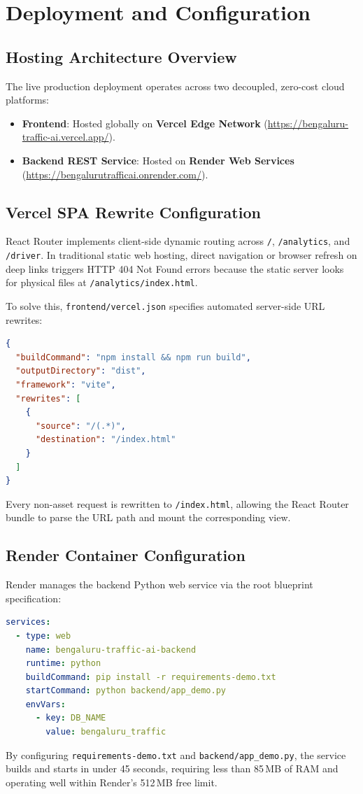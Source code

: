 \chapter{Deployment and Configuration}

\section{Hosting Architecture Overview}
The live production deployment operates across two decoupled, zero-cost cloud platforms:
\begin{itemize}[leftmargin=*]
    \item \textbf{Frontend}: Hosted globally on \textbf{Vercel Edge Network} (\url{https://bengaluru-traffic-ai.vercel.app/}).
    \item \textbf{Backend REST Service}: Hosted on \textbf{Render Web Services} (\url{https://bengalurutrafficai.onrender.com/}).
\end{itemize}

\section{Vercel SPA Rewrite Configuration}
React Router implements client-side dynamic routing across \texttt{/}, \texttt{/analytics}, and \texttt{/driver}. In traditional static web hosting, direct navigation or browser refresh on deep links triggers HTTP 404 Not Found errors because the static server looks for physical files at \texttt{/analytics/index.html}.

To solve this, \texttt{frontend/vercel.json} specifies automated server-side URL rewrites:
\begin{lstlisting}[language=json,caption={Vercel SPA Rewrite Rules (\texttt{frontend/vercel.json})}]
{
  "buildCommand": "npm install && npm run build",
  "outputDirectory": "dist",
  "framework": "vite",
  "rewrites": [
    {
      "source": "/(.*)",
      "destination": "/index.html"
    }
  ]
}
\end{lstlisting}
Every non-asset request is rewritten to \texttt{/index.html}, allowing the React Router bundle to parse the URL path and mount the corresponding view.

\section{Render Container Configuration}
Render manages the backend Python web service via the root blueprint specification:
\begin{lstlisting}[language=yaml,caption={Render Service Configuration (\texttt{render.yaml})}]
services:
  - type: web
    name: bengaluru-traffic-ai-backend
    runtime: python
    buildCommand: pip install -r requirements-demo.txt
    startCommand: python backend/app_demo.py
    envVars:
      - key: DB_NAME
        value: bengaluru_traffic
\end{lstlisting}
By configuring \texttt{requirements-demo.txt} and \texttt{backend/app\_demo.py}, the service builds and starts in under 45 seconds, requiring less than 85\,MB of RAM and operating well within Render's 512\,MB free limit.

